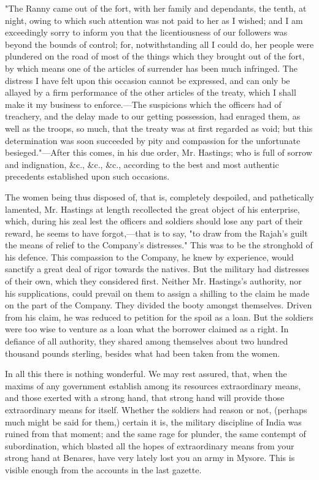 "The Ranny came out of the fort, with her family and dependants, the tenth, at night, owing to which such attention was not paid to her as I wished; and I am exceedingly sorry to inform you that the licentiousness of our followers was beyond the bounds of control; for, notwithstanding all I could do, her people were plundered on the road of most of the things which they brought out of the fort, by which means one of the articles of surrender has been much infringed. The distress I have felt upon this occasion cannot be expressed, and can only be allayed by a firm performance of the other articles of the treaty, which I shall make it my business to enforce.—The suspicions which the officers had of treachery, and the delay made to our getting possession, had enraged them, as well as the troops, so much, that the treaty was at first regarded as void; but this determination was soon succeeded by pity and compassion for the unfortunate besieged."—After this comes, in his due order, Mr. Hastings; who is full of sorrow and indignation, \&c., \&c., \&c., according to the best and most authentic precedents established upon such occasions.

The women being thus disposed of, that is, completely despoiled, and pathetically lamented, Mr. Hastings at length recollected the great object of his enterprise, which, during his zeal lest the officers and soldiers should lose any part of their reward, he seems to have forgot,—that is to say, "to draw from the Rajah's guilt the means of relief to the Company's distresses." This was to be the stronghold of his defence. This compassion to the Company, he knew by experience, would sanctify a great deal of rigor towards the natives. But the military had distresses of their own, which they considered first. Neither Mr. Hastings's authority, nor his supplications, could prevail on them to assign a shilling to the claim he made on the part of the Company. They divided the booty amongst themselves. Driven from his claim, he was reduced to petition for the spoil as a loan. But the soldiers were too wise to venture as a loan what the borrower claimed as a right. In defiance of all authority, they shared among themselves about two hundred thousand pounds sterling, besides what had been taken from the women.

In all this there is nothing wonderful. We may rest assured, that, when the maxims of any government establish among its resources extraordinary means, and those exerted with a strong hand, that strong hand will provide those extraordinary means for itself. Whether the soldiers had reason or not, (perhaps much might be said for them,) certain it is, the military discipline of India was ruined from that moment; and the same rage for plunder, the same contempt of subordination, which blasted all the hopes of extraordinary means from your strong hand at Benares, have very lately lost you an army in Mysore. This is visible enough from the accounts in the last gazette.

